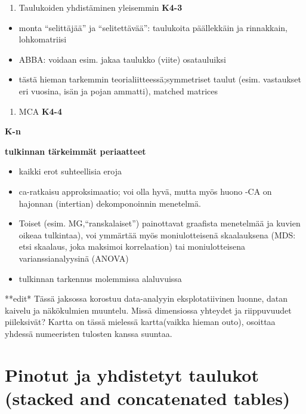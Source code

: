 \documentclass[
  finnish,
]{book}
\providecommand{\tightlist}{%
  \setlength{\itemsep}{0pt}\setlength{\parskip}{0pt}}
\begin{document}
\begin{enumerate}
\def\labelenumi{\arabic{enumi}.}
\setcounter{enumi}{2}
\tightlist
\item
  Taulukoiden yhdistäminen yleisemmin \textbf{K4-3}
\end{enumerate}

\begin{itemize}
\tightlist
\item
  monta ``selittäjää'' ja ``selitettävää'': taulukoita päällekkäin ja
  rinnakkain, lohkomatriisi
\item
  ABBA: voidaan esim. jakaa taulukko (viite) osatauluiksi
\item
  tästä hieman tarkemmin teorialiitteessä;symmetriset taulut (esim.
  vastaukset eri vuosina, isän ja pojan ammatti), matched matrices
\end{itemize}

\begin{enumerate}
\def\labelenumi{\arabic{enumi}.}
\setcounter{enumi}{3}
\tightlist
\item
  MCA \textbf{K4-4}
\end{enumerate}

\textbf{K-n}

\textbf{tulkinnan tärkeimmät periaatteet}

\begin{itemize}
\tightlist
\item
  kaikki erot suhteellisia eroja
\item
  ca-ratkaisu approksimaatio; voi olla hyvä, mutta myös huono -CA on
  hajonnan (intertian) dekomponoinnin menetelmä.
\item
  Toiset (esim. MG,``ranskalaiset'') painottavat graafista menetelmää ja
  kuvien oikeaa tulkintaa), voi ymmärtää myös moniulotteisenä
  skaalauksena (MDS: etsi skaalaus, joka maksimoi korrelaation) tai
  moniulotteisena varianssianalyysinä (ANOVA)
\item
  tulkinnan tarkennus molemmissa alaluvuissa
\end{itemize}

**edit* Tässä jaksossa korostuu data-analyyin eksplotatiivinen luonne,
datan kaivelu ja näkökulmien muuntelu. Missä dimensiossa yhteydet ja
riippuvuudet piileksivät? Kartta on tässä mielessä kartta(vaikka hieman
outo), osoittaa yhdessä numeeristen tulosten kanssa suuntaa.

\hypertarget{pinotut-ja-yhdistetyt-taulukot-stacked-and-concatenated-tables}{%
\section{Pinotut ja yhdistetyt taulukot (stacked and concatenated
tables)}\label{pinotut-ja-yhdistetyt-taulukot-stacked-and-concatenated-tables}}
\end{document}
